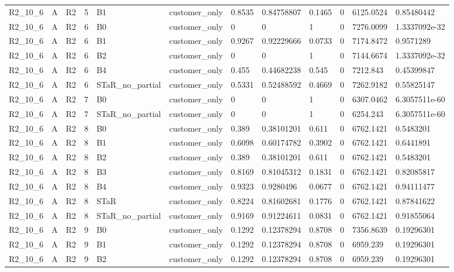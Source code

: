 \begin{longtable}{llllllllllll}
R2\_10\_6 & A & R2 & 5 & B1 & customer\_only & 0.8535 & 0.84758807 & 0.1465 & 0 & 6125.0524 & 0.85480442 \\
R2\_10\_6 & A & R2 & 6 & B0 & customer\_only & 0 & 0 & 1 & 0 & 7276.0099 & 1.3337092e-32 \\
R2\_10\_6 & A & R2 & 6 & B1 & customer\_only & 0.9267 & 0.92229666 & 0.0733 & 0 & 7174.8472 & 0.9571289 \\
R2\_10\_6 & A & R2 & 6 & B2 & customer\_only & 0 & 0 & 1 & 0 & 7144.6674 & 1.3337092e-32 \\
R2\_10\_6 & A & R2 & 6 & B4 & customer\_only & 0.455 & 0.44682238 & 0.545 & 0 & 7212.843 & 0.45399847 \\
R2\_10\_6 & A & R2 & 6 & STaR\_no\_partial & customer\_only & 0.5331 & 0.52488592 & 0.4669 & 0 & 7262.9182 & 0.55825147 \\
R2\_10\_6 & A & R2 & 7 & B0 & customer\_only & 0 & 0 & 1 & 0 & 6307.0462 & 6.3057511e-60 \\
R2\_10\_6 & A & R2 & 7 & STaR\_no\_partial & customer\_only & 0 & 0 & 1 & 0 & 6254.243 & 6.3057511e-60 \\
R2\_10\_6 & A & R2 & 8 & B0 & customer\_only & 0.389 & 0.38101201 & 0.611 & 0 & 6762.1421 & 0.5483201 \\
R2\_10\_6 & A & R2 & 8 & B1 & customer\_only & 0.6098 & 0.60174782 & 0.3902 & 0 & 6762.1421 & 0.6441891 \\
R2\_10\_6 & A & R2 & 8 & B2 & customer\_only & 0.389 & 0.38101201 & 0.611 & 0 & 6762.1421 & 0.5483201 \\
R2\_10\_6 & A & R2 & 8 & B3 & customer\_only & 0.8169 & 0.81045312 & 0.1831 & 0 & 6762.1421 & 0.82085817 \\
R2\_10\_6 & A & R2 & 8 & B4 & customer\_only & 0.9323 & 0.9280496 & 0.0677 & 0 & 6762.1421 & 0.94111477 \\
R2\_10\_6 & A & R2 & 8 & STaR & customer\_only & 0.8224 & 0.81602681 & 0.1776 & 0 & 6762.1421 & 0.87841622 \\
R2\_10\_6 & A & R2 & 8 & STaR\_no\_partial & customer\_only & 0.9169 & 0.91224611 & 0.0831 & 0 & 6762.1421 & 0.91855064 \\
R2\_10\_6 & A & R2 & 9 & B0 & customer\_only & 0.1292 & 0.12378294 & 0.8708 & 0 & 7356.8639 & 0.19296301 \\
R2\_10\_6 & A & R2 & 9 & B1 & customer\_only & 0.1292 & 0.12378294 & 0.8708 & 0 & 6959.239 & 0.19296301 \\
R2\_10\_6 & A & R2 & 9 & B2 & customer\_only & 0.1292 & 0.12378294 & 0.8708 & 0 & 6959.239 & 0.19296301 \\

\end{longtable}
